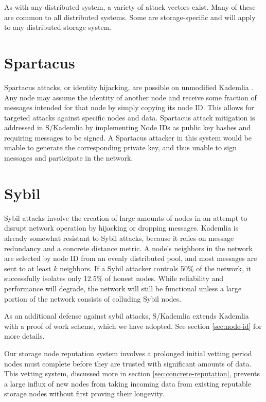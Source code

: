 \documentclass[11pt,fleqn,openany]{book}
\begin{document}
As with any distributed system, a variety of attack vectors exist. Many of these
are common to all distributed systems. Some are storage-specific and will apply
to any distributed storage system.

\section{Spartacus}

Spartacus attacks, or identity hijacking, are possible on unmodified Kademlia
\cite{kad}.
Any node may assume the identity of another node and receive some fraction of
messages intended for that node by simply copying its node ID.
This allows for targeted attacks against specific nodes and data.
Spartacus attack mitigation is addressed in S/Kademlia \cite{skad} by
implementing Node IDs as public key hashes and requiring messages to be signed.
A Spartacus attacker in this system would be unable to generate the
corresponding private key, and thus unable to sign messages and participate in
the network.

\section{Sybil}

Sybil attacks involve the creation of large amounts of nodes in an attempt to
disrupt network operation by hijacking or dropping messages. Kademlia
\cite{kad} is already somewhat resistant to Sybil attacks, because
it relies on message redundancy and a concrete distance metric.
A node's neighbors in the network are selected by
node ID from an evenly distributed pool, and most messages are sent to at least
$k$ neighbors. If a Sybil attacker controls 50\% of the network, it
successfully isolates only 12.5\% of honest nodes. While reliability and
performance will degrade, the network will still be functional unless a large
portion of the network consists of colluding Sybil nodes.

As an additional defense against sybil attacks, S/Kademlia \cite{skad}
extends Kademlia with a proof of work scheme, which we have adopted. See section
\ref{sec:node-id} for more details.

Our storage node reputation system involves a prolonged initial vetting
period nodes must complete before they are trusted with significant amounts
of data. This vetting system, discussed more in section
\ref{sec:concrete-reputation}, prevents a large influx of new nodes from taking
incoming data from existing reputable storage nodes without first proving
their longevity.
\end{document}
